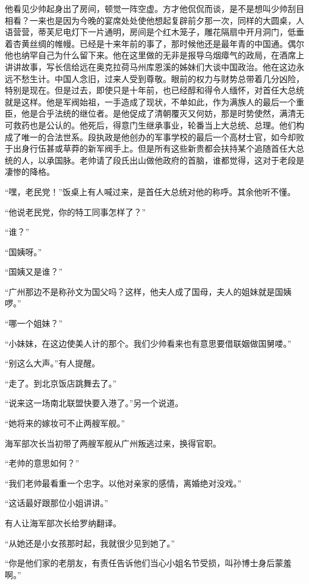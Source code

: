 \par 他看见少帅起身出了房间，顿觉一阵空虚。方才他侃侃而谈，是不是想叫少帅刮目相看？一来也是因为今晚的宴席处处使他想起复辟前夕那一次，同样的大圆桌，人语营营，蒂芙尼电灯下一片通明，房间是个红木笼子，雕花隔扇中开月洞门，低垂着杏黄丝绸的帷幔。已经是十来年前的事了，那时候他还是最年青的中国通。偶尔他也纳罕自己为什么留下来。他在这里做的无非是报导乌烟瘴气的政局，在酒席上讲讲故事，写长信给远在奥克拉荷马州库恩溪的姊妹们大谈中国政治。他在这边永远不愁生计。中国人念旧，过来人受到尊敬。眼前的权力与财势总带着几分凶险，特别是现在。但是过去，即使只是十年前，也已经醇和得令人缅怀，对首任大总统就是这样。他是军阀始祖，一手造成了现状，不单如此，作为满族人的最后一个重臣，他是合乎法统的继位者。是他促成了清朝覆灭又何妨，那是时势使然，满清无可救药也是公认的。他死后，得意门生继承事业，轮番当上大总统、总理。他们构成了唯一的合法世系。段执政是他创办的军事学校的最后一个高材士官，如今却败于出身行伍甚或草莽的新军阀手上。但是所有这些新贵都会扶持某个追随首任大总统的人，以承国脉。老帅请了段氏出山做他政府的首脑，谁都觉得，这对于老段是凄惨的降格。
\par “嘿，老民党！”饭桌上有人喊过来，是首任大总统对他的称呼。其余他听不懂。
\par “他说老民党，你的特工同事怎样了？”
\par “谁？”
\par “国姨呀。”
\par “国姨又是谁？”
\par “广州那边不是称孙文为国父吗？这样，他夫人成了国母，夫人的姐妹就是国姨啰。”
\par “哪一个姐妹？”
\par “小妹妹，在这边使美人计的那个。我们少帅看来也有意思要借联姻做国舅喽。”
\par “别这么大声。”有人提醒。
\par “走了。到北京饭店跳舞去了。”
\par “说来这一场南北联盟快要入港了。”另一个说道。
\par “她将来的嫁妆可不止两艘军舰。”
\par 海军部次长当初带了两艘军舰从广州叛逃过来，换得官职。
\par “老帅的意思如何？”
\par “我们老帅最看重一个忠字。以他对亲家的感情，离婚绝对没戏。”
\par “这话最好跟那位小姐讲讲。”
\par 有人让海军部次长给罗纳翻译。
\par “从她还是小女孩那时起，我就很少见到她了。”
\par “你是他们家的老朋友，有责任告诉他们当心小姐名节受损，叫孙博士身后蒙羞啊。”
